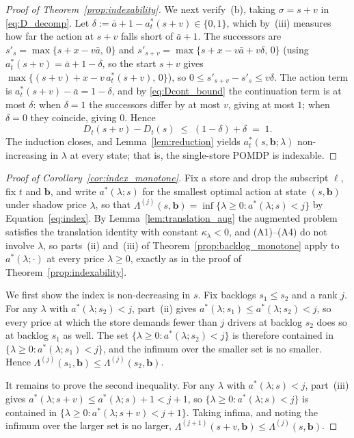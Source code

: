 \documentclass[preprint,11pt,authoryear]{elsarticle}
\newcommand{\bvec}[1]{\mathbf{#1}}
\theoremstyle{remark}
\begin{document}
\begin{proof}[Proof of Theorem~\ref{prop:indexability}]
We next verify~(b), taking $\sigma = s+v$ in \eqref{eq:D_decomp}. Let $\delta := \bar a + 1 - a^*_t(s+v) \in \{0,1\}$, which by~(iii) measures how far the action at $s+v$ falls short of $\bar a + 1$. The successors are $s'_s = \max\{s + x - v\bar a,\, 0\}$ and $s'_{s+v} = \max\{s + x - v\bar a + v\delta,\, 0\}$ (using $a^*_t(s+v) = \bar a + 1 - \delta$, so the start $s+v$ gives $\max\{(s+v)+x - v\,a^*_t(s+v),\, 0\}$), so $0 \le s'_{s+v} - s'_s \le v\delta$. The action term is $a^*_t(s+v) - \bar a = 1 - \delta$, and by \eqref{eq:Dcont_bound} the continuation term is at most $\delta$: when $\delta = 1$ the successors differ by at most $v$, giving at most $1$; when $\delta = 0$ they coincide, giving $0$. Hence
\[
D_t(s+v) - D_t(s) \;\le\; (1 - \delta) + \delta \;=\; 1.
\]
The induction closes, and Lemma~\ref{lem:reduction} yields $a^*_t(s, \bvec{b}; \lambda)$ non-increasing in $\lambda$ at every state; that is, the single-store POMDP is indexable.
\end{proof}

\corIndexMono*
\begin{proof}[Proof of Corollary~\ref{cor:index_monotone}]
Fix a store and drop the subscript $\ell$, fix $t$ and $\bvec{b}$, and write $a^*(\lambda; s)$ for the smallest optimal action at state $(s, \bvec{b})$ under shadow price $\lambda$, so that $\Lambda^{(j)}(s, \bvec{b}) = \inf\{\lambda \ge 0 : a^*(\lambda; s) < j\}$ by Equation~\eqref{eq:index}. By Lemma~\ref{lem:translation_aug} the augmented problem satisfies the translation identity with constant $\kappa_\lambda < 0$, and (A1)--(A4) do not involve $\lambda$, so parts~(ii) and~(iii) of Theorem~\ref{prop:backlog_monotone} apply to $a^*(\lambda; \cdot)$ at every price $\lambda \ge 0$, exactly as in the proof of Theorem~\ref{prop:indexability}.

We first show the index is non-decreasing in $s$. Fix backlogs $s_1 \le s_2$ and a rank $j$. For any $\lambda$ with $a^*(\lambda; s_2) < j$, part~(ii) gives $a^*(\lambda; s_1) \le a^*(\lambda; s_2) < j$, so every price at which the store demands fewer than $j$ drivers at backlog $s_2$ does so at backlog $s_1$ as well. The set $\{\lambda \ge 0 : a^*(\lambda; s_2) < j\}$ is therefore contained in $\{\lambda \ge 0 : a^*(\lambda; s_1) < j\}$, and the infimum over the smaller set is no smaller. Hence $\Lambda^{(j)}(s_1, \bvec{b}) \le \Lambda^{(j)}(s_2, \bvec{b})$.

It remains to prove the second inequality. For any $\lambda$ with $a^*(\lambda; s) < j$, part~(iii) gives $a^*(\lambda; s+v) \le a^*(\lambda; s) + 1 < j+1$, so $\{\lambda \ge 0 : a^*(\lambda; s) < j\}$ is contained in $\{\lambda \ge 0 : a^*(\lambda; s+v) < j+1\}$. Taking infima, and noting the infimum over the larger set is no larger, $\Lambda^{(j+1)}(s+v, \bvec{b}) \le \Lambda^{(j)}(s, \bvec{b})$.
\end{proof}
\end{document}
